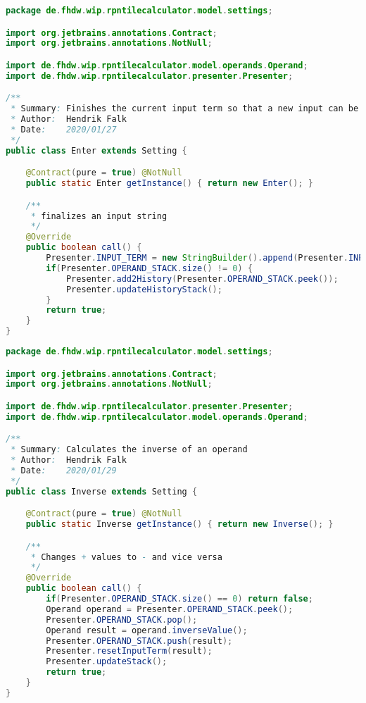 \begin{lstlisting}[caption=Enter (Falk),label=list:Enter,language=Java]
package de.fhdw.wip.rpntilecalculator.model.settings;

import org.jetbrains.annotations.Contract;
import org.jetbrains.annotations.NotNull;

import de.fhdw.wip.rpntilecalculator.model.operands.Operand;
import de.fhdw.wip.rpntilecalculator.presenter.Presenter;

/**
 * Summary: Finishes the current input term so that a new input can be created
 * Author:  Hendrik Falk
 * Date:    2020/01/27
 */
public class Enter extends Setting {

    @Contract(pure = true) @NotNull
    public static Enter getInstance() { return new Enter(); }

    /**
     * finalizes an input string
     */
    @Override
    public boolean call() {
        Presenter.INPUT_TERM = new StringBuilder().append(Presenter.INPUT_FINALIZED);
        if(Presenter.OPERAND_STACK.size() != 0) {
            Presenter.add2History(Presenter.OPERAND_STACK.peek());
            Presenter.updateHistoryStack();
        }
        return true;
    }
}

\end{lstlisting}    

\begin{lstlisting}[caption=Inverse (Falk),label=list:Inverse,language=Java]
package de.fhdw.wip.rpntilecalculator.model.settings;

import org.jetbrains.annotations.Contract;
import org.jetbrains.annotations.NotNull;

import de.fhdw.wip.rpntilecalculator.presenter.Presenter;
import de.fhdw.wip.rpntilecalculator.model.operands.Operand;

/**
 * Summary: Calculates the inverse of an operand
 * Author:  Hendrik Falk
 * Date:    2020/01/29
 */
public class Inverse extends Setting {

    @Contract(pure = true) @NotNull
    public static Inverse getInstance() { return new Inverse(); }

    /**
     * Changes + values to - and vice versa
     */
    @Override
    public boolean call() {
        if(Presenter.OPERAND_STACK.size() == 0) return false;
        Operand operand = Presenter.OPERAND_STACK.peek();
        Presenter.OPERAND_STACK.pop();
        Operand result = operand.inverseValue();
        Presenter.OPERAND_STACK.push(result);
        Presenter.resetInputTerm(result);
        Presenter.updateStack();
        return true;
    }
}
\end{lstlisting}    

